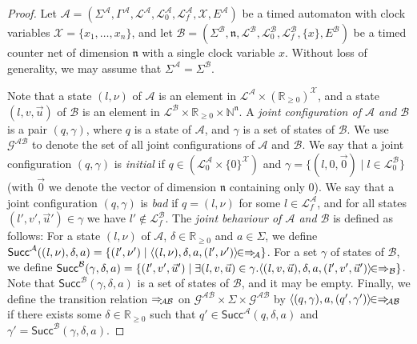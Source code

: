 \documentclass{CSML}
\theoremstyle{plain}\newtheorem{theorem}[thm]{Theorem}
\theoremstyle{plain}\newtheorem{corollary}[thm]{Corollary}
\theoremstyle{plain}\newtheorem{example}[thm]{Example}
\theoremstyle{plain}\newtheorem{lemma}[thm]{Lemma}
\theoremstyle{plain}\newtheorem{remark}[thm]{Remark}
\newcommand{\N}{\mathbb{N}}
\newcommand{\RP}{\mathbb{R}_{\geq 0}}
\newcommand{\B}{\mathcal{B}}
\newcommand{\locs}{\mathcal{L}}
\newcommand{\edges}{E}
\newcommand{\clocks}{\mathcal{X}}
\newcommand{\loc}{\mathit{l}}
\renewcommand{\succ}{\mathsf{Succ}}
\newcommand{\A}{\mathcal{A}}
\newcommand{\gs}{\mathcal{G}} \newcommand{\hs}{\mathcal{H}}
\newcommand{\transA}{\Rightarrow_{\hspace{-.8mm}\A}}
\newcommand{\transAB}{\Rightarrow_{\hspace{-.8mm}\A\B}}
\begin{document}
\begin{proof}
		
		
		Let $\A=(\Sigma^\A,\Gamma^\A,\locs^\A,\locs_0^\A,\locs_f^\A,\clocks,\edges^\A)$ be a timed automaton with clock variables $\clocks=\{x_1,\dots,x_n\}$, 
		and let $\B=(\Sigma^\B,\mathfrak{n},\locs^\B,\locs_0^\B,\locs_f^\B,\{x\},\edges^\B)$ be a timed counter net of dimension $\mathfrak{n}$ with a single clock variable $x$.
		Without loss of generality, we may assume that $\Sigma^\A=\Sigma^\B$. 


		Note that a state $(\loc,\nu)$ of $\A$ is an element in $\locs^\A\times(\RP)^{\clocks}$, 
		and a state $(\loc,v,\vec{u})$ of $\B$ is an element in $\locs^\B\times\RP\times\N^{\mathfrak{n}}$.		
		A \emph{joint configuration of $\A$ and $\B$} is a
		pair $(q,\gamma)$, where $q$ is a state of $\A$, and $\gamma$ is a set of states of $\B$.
		We use $\gs^{\A\B}$ to denote the set of all joint configurations of $\A$ and $\B$. 		
		We say that a joint configuration $(q,\gamma)$ is \emph{initial} if $q\in(\locs_0^\A\times \{0\}^\clocks)$ and $\gamma=\{(\loc,0,\vec{0}) \mid \loc\in\locs^\B_0\}$ (with 
		$\vec{0}$ we denote the vector of dimension $\mathfrak{n}$ containing only $0$).
		We say that a joint configuration $(q,\gamma)$ is \emph{bad} if $q=(\loc,\nu)$ for some $\loc\in\locs_f^\A$, and for all states $(\loc',v',\vec{u}')\in\gamma$ we have $\loc'\not\in\locs_f^\B$. 
		The \emph{joint behaviour of $\A$ and $\B$} is defined as follows: 
		For a state $(\loc,\nu)$ of $\A$, $\delta\in\RP$ and $a\in\Sigma$, 
		we define $\succ^\A((\loc,\nu),\delta,a)=\{(\loc',\nu')\mid \langle(\loc,\nu),\delta,a, (\loc',\nu')\rangle\hspace{-1.4mm}\in\transA\}$.
For a set $\gamma$ of states of $\B$, we define 
		$\succ^\B(\gamma,\delta,a)=\{(\loc',v',\vec{u}')\mid \exists (\loc,v,\vec{u})\in\gamma. \langle(\loc,v,\vec{u}),\delta, a, (\loc',v',\vec{u}')\rangle\hspace{-1.4mm}\in\Rightarrow_\B\}$. Note that $\succ^\B(\gamma,\delta,a)$ is a set of states of $\B$, and it may be empty. 
		Finally, we define the transition relation $\transAB$ on $\gs^{\A\B}\times\Sigma\times\gs^{\A\B}$ by  $\langle(q,\gamma),a,(q',\gamma')\rangle\hspace{-1.4mm}\in\transAB$ if there exists some $\delta\in\RP$ such that $q'\in\succ^\A(q,\delta,a)$ and  $\gamma'=\succ^\B(\gamma,\delta,a)$. 
		

\end{proof}
\end{document}
